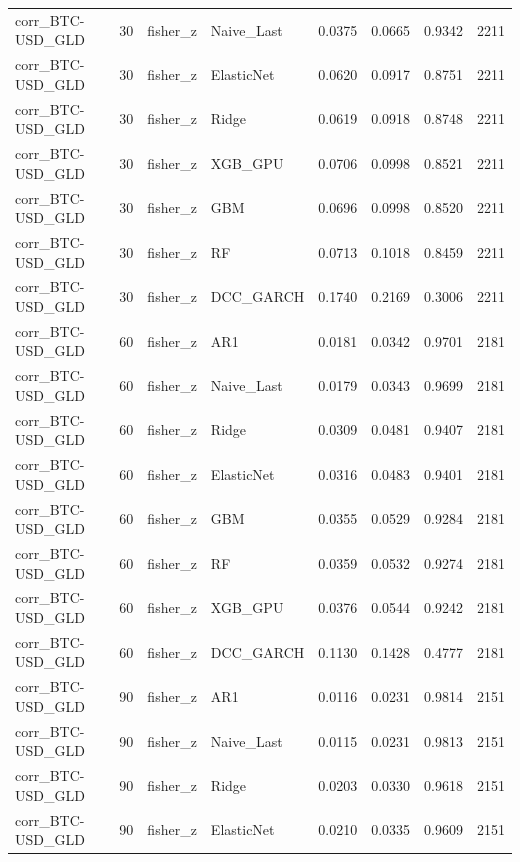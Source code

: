 \begin{table}[H]
\begin{tabular}{llllrrrr}
corr_BTC-USD_GLD & 30 & fisher_z & Naive_Last & 0.0375 & 0.0665 & 0.9342 & 2211 \\
corr_BTC-USD_GLD & 30 & fisher_z & ElasticNet & 0.0620 & 0.0917 & 0.8751 & 2211 \\
corr_BTC-USD_GLD & 30 & fisher_z & Ridge & 0.0619 & 0.0918 & 0.8748 & 2211 \\
corr_BTC-USD_GLD & 30 & fisher_z & XGB_GPU & 0.0706 & 0.0998 & 0.8521 & 2211 \\
corr_BTC-USD_GLD & 30 & fisher_z & GBM & 0.0696 & 0.0998 & 0.8520 & 2211 \\
corr_BTC-USD_GLD & 30 & fisher_z & RF & 0.0713 & 0.1018 & 0.8459 & 2211 \\
corr_BTC-USD_GLD & 30 & fisher_z & DCC_GARCH & 0.1740 & 0.2169 & 0.3006 & 2211 \\
corr_BTC-USD_GLD & 60 & fisher_z & AR1 & 0.0181 & 0.0342 & 0.9701 & 2181 \\
corr_BTC-USD_GLD & 60 & fisher_z & Naive_Last & 0.0179 & 0.0343 & 0.9699 & 2181 \\
corr_BTC-USD_GLD & 60 & fisher_z & Ridge & 0.0309 & 0.0481 & 0.9407 & 2181 \\
corr_BTC-USD_GLD & 60 & fisher_z & ElasticNet & 0.0316 & 0.0483 & 0.9401 & 2181 \\
corr_BTC-USD_GLD & 60 & fisher_z & GBM & 0.0355 & 0.0529 & 0.9284 & 2181 \\
corr_BTC-USD_GLD & 60 & fisher_z & RF & 0.0359 & 0.0532 & 0.9274 & 2181 \\
corr_BTC-USD_GLD & 60 & fisher_z & XGB_GPU & 0.0376 & 0.0544 & 0.9242 & 2181 \\
corr_BTC-USD_GLD & 60 & fisher_z & DCC_GARCH & 0.1130 & 0.1428 & 0.4777 & 2181 \\
corr_BTC-USD_GLD & 90 & fisher_z & AR1 & 0.0116 & 0.0231 & 0.9814 & 2151 \\
corr_BTC-USD_GLD & 90 & fisher_z & Naive_Last & 0.0115 & 0.0231 & 0.9813 & 2151 \\
corr_BTC-USD_GLD & 90 & fisher_z & Ridge & 0.0203 & 0.0330 & 0.9618 & 2151 \\
corr_BTC-USD_GLD & 90 & fisher_z & ElasticNet & 0.0210 & 0.0335 & 0.9609 & 2151 \\
\bottomrule
\end{tabular}
\end{table}